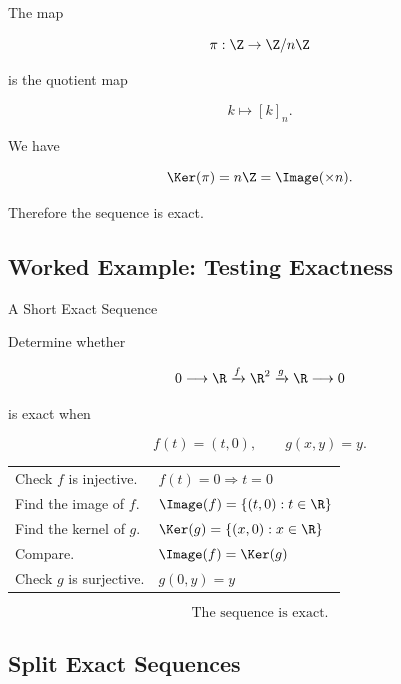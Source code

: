 The map

\[ \pi:\Z\to\Z/n\Z \]

is the quotient map

\[ k\mapsto[k]_n. \]

We have

\[ \Ker(\pi)=n\Z=\Image(\times n). \]

Therefore the sequence is exact.

\subsection{Worked Example: Testing Exactness}
\label{subsec:worked-testing-exactness}

\begin{workedexamplebox}{A Short Exact Sequence}

Determine whether

\[ 0\longrightarrow\R
\xrightarrow{f}\R^2
\xrightarrow{g}\R
\longrightarrow0 \]

is exact when

\[ f(t)=(t,0),\qquad g(x,y)=y. \]

\begin{tabularx}{\textwidth}{@{}>{\raggedright\arraybackslash}p{}X@{}}
Check \(f\) is injective. & \(f(t)=0\Rightarrow t=0\)\\
Find the image of \(f\). &
\(\displaystyle \Image(f)=\{(t,0):t\in\R\}\)\\
Find the kernel of \(g\). &
\(\displaystyle \Ker(g)=\{(x,0):x\in\R\}\)\\
Compare. & \(\Image(f)=\Ker(g)\)\\
Check \(g\) is surjective. & \(g(0,y)=y\)
\end{tabularx}

\begin{answerbox}
\[ \boxed{\text{The sequence is exact.}} \]
\end{answerbox}
\end{workedexamplebox}

\subsection{Split Exact Sequences}
\label{subsec:split-exact-sequences}

